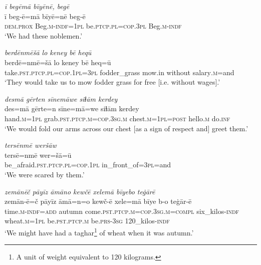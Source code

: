 \ea \label{RE.63}
\textit{ī begēmā bīyēnē, begē} \\ 
\gll ī beg-ē=mā bīyē=nē beg-ē \\ 
 \textsc{dem.prox} Beg\textsc{.m}\textsc{-indf}\textsc{=\textsc{1pl}} be\textsc{.ptcp}\textsc{.pl}\textsc{=cop}\textsc{.3pl} Beg\textsc{.m}\textsc{-indf} \\ 
\glt `We had these noblemen.'
\z 
 
\ea \label{RE.65}
\textit{berdēnmēšā lo keney bē heqū} \\ 
\gll berdē=nmē=šā lo keney bē heq=ū \\ 
 take\textsc{.pst}\textsc{.ptcp}\textsc{.pl}\textsc{=cop}\textsc{.\textsc{1pl}}\textsc{=3pl} fodder\_grass mow.in without salary\textsc{.m}=and \\ 
\glt `They would take us to mow fodder grass for free [i.e. without wages].'
\z 
 
\ea \label{RE.68}
\textit{desmā gērten sīnemāwe siɫām kerdey} \\ 
\gll des=mā gērte=n sīne=mā=we siɫām kerdey \\ 
 hand\textsc{.m}\textsc{=\textsc{1pl}} grab\textsc{.pst}\textsc{.ptcp}\textsc{.m}\textsc{=cop}\textsc{.3sg}\textsc{.m} chest\textsc{.m}\textsc{=\textsc{1pl}}\textsc{=\textsc{post}} hello\textsc{.m} do\textsc{.inf} \\ 
\glt `We would fold our arms across our chest [as a sign of respect and] greet them.'
\z 
 
\ea \label{RE.69}
\textit{tersēnmē weršāw} \\ 
\gll tersē=nmē wer=šā=ū \\ 
 be\_afraid\textsc{.pst}\textsc{.ptcp}\textsc{.pl}\textsc{=cop}\textsc{.\textsc{1pl}} in\_front\_of\textsc{=3pl}=and \\ 
\glt `We were scared by them.'
\z 
 
\ea \label{RE.70}
\textit{zemānēč pāyīz āmāno kewčē xelemā bīyebo teġārē} \\ 
\gll zemān-ē=č pāyīz āmā=n=o kewč-ē xele=mā bīye b-o teġār-ē \\ 
 time\textsc{.m}\textsc{-indf}\textsc{=add} autumn come\textsc{.pst}\textsc{.ptcp}\textsc{.m}\textsc{=cop}\textsc{.3sg}\textsc{.m}\textsc{=compl} six\_kilos\textsc{-indf} wheat\textsc{.m}\textsc{=\textsc{1pl}} be\textsc{.pst}\textsc{.ptcp}\textsc{.m} be\textsc{.prs}\textsc{-3sg} 120\_kilos\textsc{-indf} \\ 
\glt `We might have had a taghar\footnote{A unit of weight equivalent to 120 kilograms.} of wheat when it was autumn.'
\z 
 
